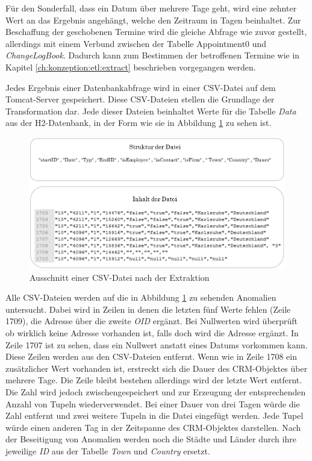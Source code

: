 Für den Sonderfall, dass ein Datum über mehrere Tage geht, wird eine zehnter Wert an das Ergebnis angehängt, welche den Zeitraum in Tagen beinhaltet. Zur Beschaffung der geschobenen Termine wird die gleiche Abfrage wie zuvor gestellt, allerdings mit einem Verbund zwischen der Tabelle Appointment0 und \textit{ChangeLogBook}. Dadurch kann zum Bestimmen der betroffenen Termine wie in Kapitel \ref{ch:konzeption:etl:extract} beschrieben vorgegangen werden.

Jedes Ergebnis einer Datenbankabfrage wird in einer CSV-Datei auf dem Tomcat-Server gespeichert. Diese CSV-Dateien stellen die Grundlage der Transformation dar. Jede dieser Dateien beinhaltet Werte für die Tabelle \textit{Data} aus der H2-Datenbank, in der Form wie sie in Abbildung \ref{fig:umsetzung_csv_datei} zu sehen ist. 

\begin{figure}[htbp]
\begin{center}
\includegraphics[width=1.0\textwidth]{pics/umsetzung_csv_datei.png}
\caption{Ausschnitt einer CSV-Datei nach der Extraktion}
\label{fig:umsetzung_csv_datei}
\end{center}
\end{figure}

Alle CSV-Dateien werden auf die in Abbildung \ref{fig:umsetzung_csv_datei} zu sehenden Anomalien untersucht. Dabei wird in Zeilen in denen die letzten fünf Werte fehlen (Zeile 1709), die Adresse über die zweite \textit{OID} ergänzt. Bei Nullwerten wird überprüft ob wirklich keine Adresse vorhanden ist, falls doch wird die Adresse ergänzt. In Zeile 1707 ist zu sehen, dass ein Nullwert anstatt eines Datums vorkommen kann. Diese Zeilen werden aus den CSV-Dateien entfernt. Wenn wie in Zeile 1708 ein zusätzlicher Wert vorhanden ist, erstreckt sich die Dauer des CRM-Objektes über mehrere Tage. Die Zeile bleibt bestehen allerdings wird der letzte Wert entfernt. Die Zahl wird jedoch zwischengespeichert und zur Erzeugung der entsprechenden Anzahl von Tupeln wiederverwendet. Bei einer Dauer von drei Tagen würde die Zahl entfernt und zwei weitere Tupeln in die Datei eingefügt werden. Jede Tupel würde einen anderen Tag in der Zeitspanne des CRM-Objektes darstellen. Nach der Beseitigung von Anomalien werden noch die Städte und Länder durch ihre jeweilige \textit{ID} aus der Tabelle \textit{Town} und \textit{Country} ersetzt.

